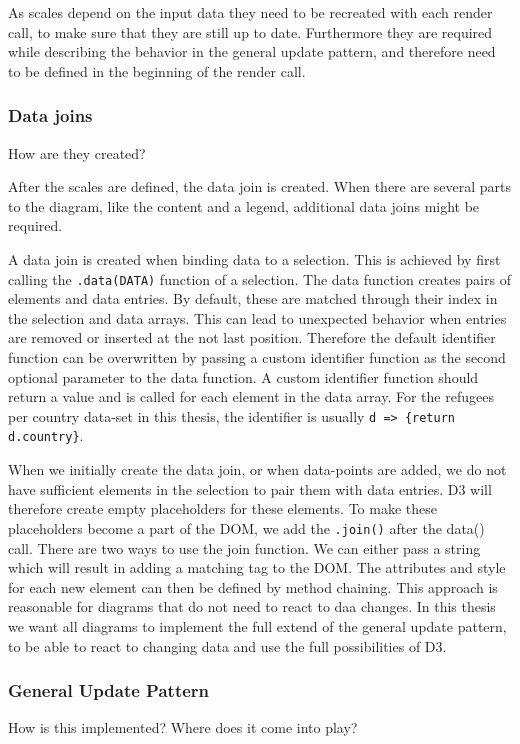 As scales depend on the input data they need to be recreated with each render call, to make sure that they are still up to date. Furthermore they are required while describing the behavior in the general update pattern, and therefore need to be defined in the beginning of the render call.

\subsubsection{Data joins}
How are they created?

After the scales are defined, the data join is created. When there are several parts to the diagram, like the content and a legend, additional data joins might be required.

A data join is created when binding data to a selection. This is achieved by first calling the \verb|.data(DATA)| function of a selection. The data function creates pairs of elements and data entries. By default, these are matched through their index in the selection and data arrays. This can lead to unexpected behavior when entries are removed or inserted at the not last position. Therefore the default identifier function can be overwritten by passing a custom identifier function as the second optional parameter to the data function. A custom identifier function should return a value and is called for each element in the data array. For the refugees per country data-set in this thesis, the identifier is usually \verb|d => {return d.country}|.

When we initially create the data join, or when data-points are added, we do not have sufficient elements in the selection to pair them with data entries. D3 will therefore create empty placeholders for these elements. To make these placeholders become a part of the DOM, we add the \verb|.join()| after the data() call. There are two ways to use the join function. We can either pass a string which will result in adding a matching tag to the DOM. The attributes and style for each new element can then be defined by method chaining. This approach is reasonable for diagrams that do not need to react to daa changes. In this thesis we want all diagrams to implement the full extend of the general update pattern, to be able to react to changing data and use the full possibilities of D3.

\subsubsection{General Update Pattern}
How is this implemented? Where does it come into play?

